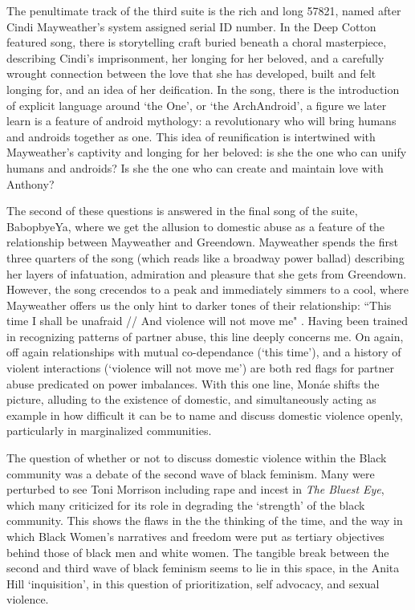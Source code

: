 \documentclass[a4paper, 11pt]{article} %
\begin{document}
The penultimate track of the third suite is the rich and long 57821, named after Cindi Mayweather's system assigned serial ID number.
In the Deep Cotton featured song, there is storytelling craft buried beneath a choral masterpiece, describing Cindi's imprisonment, her longing for her beloved, and a carefully wrought connection between the love that she has developed, built and felt longing for, and an idea of her deification.
In the song, there is the introduction of explicit language around `the One', or `the ArchAndroid', a figure we later learn is a feature of android mythology: a revolutionary who will bring humans and androids together as one.
This idea of reunification is intertwined with Mayweather's captivity and longing for her beloved: is she the one who can unify humans and androids? Is she the one who can create and maintain love with Anthony?

The second of these questions is answered in the final song of the suite, BabopbyeYa, where we get the allusion to domestic abuse as a feature of the relationship between Mayweather and Greendown.
Mayweather spends the first three quarters of the song (which reads like a broadway power ballad) describing her layers of infatuation, admiration and pleasure that she gets from Greendown.
However, the song crecendos to a peak and immediately simmers to a cool, where Mayweather offers us the only hint to darker tones of their relationship: ``This time I shall be unafraid // And violence will not move me" \cite{babopbyeya}.
Having been trained in recognizing patterns of partner abuse, this line deeply concerns me.
On again, off again relationships with mutual co-dependance (`this time'), and a history of violent interactions (`violence will not move me') are both red flags for partner abuse predicated on power imbalances.
With this one line, Mon\'ae shifts the picture, alluding to the existence of domestic, and simultaneously acting as example in how difficult it can be to name and discuss domestic violence openly, particularly in marginalized communities.

The question of whether or not to discuss domestic violence within the Black community was a debate of the second wave of black feminism.
Many were perturbed to see Toni Morrison including rape and incest in \emph{The Bluest Eye}, which many criticized for its role in degrading the `strength' of the black community.
This shows the flaws in the the thinking of the time, and the way in which Black Women's narratives and freedom were put as tertiary objectives behind those of black men and white women.
The tangible break between the second and third wave of black feminism seems to lie in this space, in the Anita Hill `inquisition', in this question of prioritization, self advocacy, and sexual violence.
\end{document}
